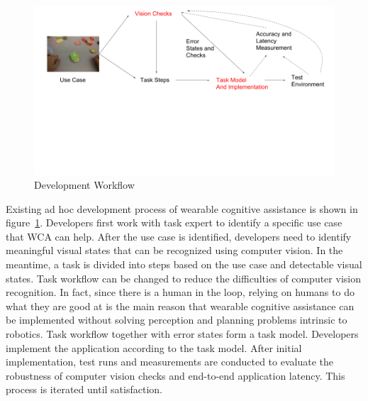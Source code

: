 \begin{figure}
  \centering
  \includegraphics[trim={0 10cm 0 0},width=\linewidth]{FIGS/ad-hoc-workflow}
  \hspace{-0.50in}
	\caption{Development Workflow}
    \vspace{-0.0in}
    \label{fig:workflow}
\end{figure}

Existing ad hoc development process of wearable cognitive assistance is shown in
figure~\ref{fig:workflow}. Developers first work with task expert to identify a
specific use case that WCA can help. After the use case is identified,
developers need to identify meaningful visual states that can be recognized
using computer vision. In the meantime, a task is divided into steps based on
the use case and detectable visual states. Task workflow can be changed to
reduce the difficulties of computer vision recognition. In fact, since there is
a human in the loop, relying on humans to do what they are good at is the main
reason that wearable cognitive assistance can be implemented without solving
perception and planning problems intrinsic to robotics. Task workflow together
with error states form a task model. Developers implement the application
according to the task model. After initial implementation, test runs and
measurements are conducted to evaluate the robustness of computer vision checks
and end-to-end application latency. This process is iterated until satisfaction.

